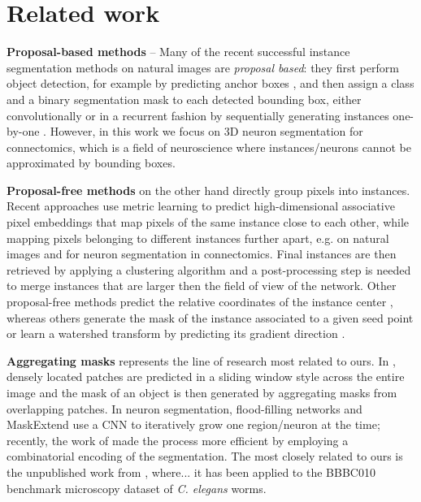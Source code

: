 
\section{Related work} \label{sec:related_work}
\textbf{Proposal-based methods} -- Many of the recent successful instance segmentation methods on natural images are \emph{proposal based}: they first perform object detection, for example by predicting anchor boxes \cite{ren2015faster}, and then assign a class and a binary segmentation mask to each detected bounding box, either convolutionally \cite{he2017mask,porzi2019seamless,liu2018path,yang2012layered,li2017fully,ladicky2010and,hariharan2014simultaneous,chen2015multi,dai2016instance,liang2016reversible} or in a recurrent fashion by sequentially generating instances one-by-one \cite{romera2016recurrent,ren2017end}. 
However, in this work we focus on 3D neuron segmentation for connectomics, which is a field of neuroscience where instances/neurons cannot be approximated by bounding boxes. 

\textbf{Proposal-free methods} on the other hand directly group pixels into instances. 
Recent approaches use metric learning to predict high-dimensional associative pixel embeddings that map pixels of the same instance close to each other, while mapping pixels belonging to different instances further apart, e.g. \cite{kong2018recurrentPix,fathi2017semantic,newell2017associative,de2017semantic} on natural images and \cite{lee2019learning} for neuron segmentation in connectomics. %
Final instances are then retrieved by applying a clustering algorithm and a post-processing step is needed to merge instances that are larger then the field of view of the network. 
Other proposal-free methods predict the relative coordinates of the instance center \cite{neven2019instance,cheng2019panopticdeeplab}, whereas others generate the mask of the instance associated to a given seed point \cite{sofiiuk2019adaptis} or  
learn a watershed transform by predicting its gradient direction \cite{bai2017deep}. 

\textbf{Aggregating \maskname masks} represents the line of research most related to ours. 
In \cite{liu2016multi}, densely located patches are predicted in a sliding window style across the entire image and the mask of an object is then generated by aggregating masks from overlapping patches.
In neuron segmentation, flood-filling networks \cite{januszewski2018high} and MaskExtend \cite{meirovitch2016multi} use a CNN to iteratively grow one region/neuron at the time; recently, the work of \cite{meirovitch2019cross} made the process more efficient by employing a combinatorial encoding of the segmentation.
The most closely related to ours is the unpublished work from \cite{hirsch2020patchperpix}, where... it has been applied to the BBBC010 benchmark microscopy dataset of \emph{C. elegans} worms.


